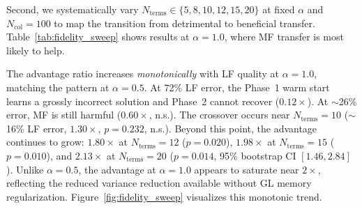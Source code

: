 \documentclass[preprint,12pt]{elsarticle}
\newcommand{\Ncol}{N_{\mathrm{col}}}
\begin{document}
Second, we systematically vary $N_{\mathrm{terms}} \in \{5, 8, 10, 12, 15, 20\}$ at fixed $\alpha$ and $\Ncol = 100$ to map the transition from detrimental to beneficial transfer. Table~\ref{tab:fidelity_sweep} shows results at $\alpha = 1.0$, where MF transfer is most likely to help.

\begin{table}[t]
\centering
\caption{Fidelity sweep at $\alpha = 1.0$, $\Ncol = 100$ (10 seeds). The advantage ratio increases monotonically beyond $N_{\mathrm{terms}} = 8$: catastrophic at 72\% LF error ($0.12\times$), crossing unity near $N_{\mathrm{terms}} = 10$ ($1.30\times$, n.s.), and reaching $\mathbf{2.13\times}$ at $N_{\mathrm{terms}} = 20$ ($p = 0.014$).}
\label{tab:fidelity_sweep}
\end{table}

The advantage ratio increases \emph{monotonically} with LF quality at $\alpha = 1.0$, matching the pattern at $\alpha = 0.5$. At 72\% LF error, the Phase~1 warm start learns a grossly incorrect solution and Phase~2 cannot recover ($0.12\times$). At $\sim$26\% error, MF is still harmful ($0.60\times$, n.s.). The crossover occurs near $N_{\mathrm{terms}} = 10$ ($\sim$16\% LF error, $1.30\times$, $p = 0.232$, n.s.). Beyond this point, the advantage continues to grow: $1.80\times$ at $N_{\mathrm{terms}} = 12$ ($p = 0.020$), $1.98\times$ at $N_{\mathrm{terms}} = 15$ ($p = 0.010$), and $\mathbf{2.13\times}$ at $N_{\mathrm{terms}} = 20$ ($p = 0.014$, 95\% bootstrap CI $[1.46, 2.84]$). Unlike $\alpha = 0.5$, the advantage at $\alpha = 1.0$ appears to saturate near $2\times$, reflecting the reduced variance reduction available without GL memory regularization. Figure~\ref{fig:fidelity_sweep} visualizes this monotonic trend.
\end{document}
